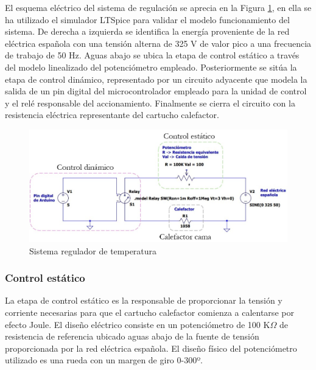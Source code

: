 El esquema eléctrico del sistema de regulación se aprecia en la Figura \ref{fig: Esquema eléctrico regulador de temperatura}, en ella se ha utilizado el simulador LTSpice \cite{LTSpiceSimulator} para validar el modelo funcionamiento del sistema. De derecha a izquierda se identifica la energía proveniente de la red eléctrica española con una tensión alterna de 325 V de valor pico a una frecuencia de trabajo de 50 Hz. Aguas abajo se ubica la etapa de control estático a través del modelo linealizado del potenciómetro empleado. Posteriormente se sitúa la etapa de control dinámico, representado por un circuito adyacente que modela la salida de un pin digital del microcontrolador empleado para la unidad de control y el relé responsable del accionamiento. Finalmente se cierra el circuito con la resistencia eléctrica representante del cartucho calefactor.

\begin{figure}[h!]
    \centering
    \includegraphics[scale=0.4]{figuras/Esquema electrico sistema regulacion termperatura.jpg}
    \caption{Sistema regulador de temperatura}
    \label{fig: Esquema eléctrico regulador de temperatura}
\end{figure}

\subsubsection*{Control estático}
\hypertarget{Control estático}{}
La etapa de control estático es la responsable de proporcionar la tensión y corriente necesarias para que el cartucho calefactor comienza a calentarse por efecto Joule. El diseño eléctrico consiste en un potenciómetro de 100 K$\Omega$ de resistencia de referencia ubicado aguas abajo de la fuente de tensión proporcionada por la red eléctrica española. El diseño físico del potenciómetro utilizado es una rueda con un margen de giro 0-300º. 

